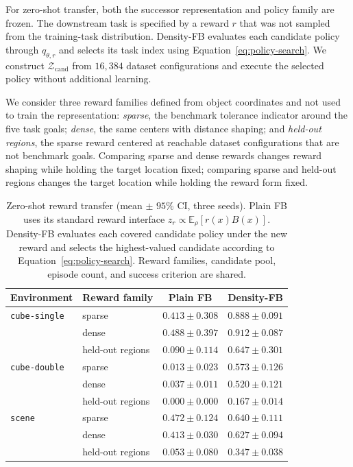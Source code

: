 \documentclass[11pt]{article}
\newcommand{\DensityFB}{Density-FB}
\begin{document}
For zero-shot transfer, both the successor representation and policy family are frozen. The downstream task is specified by a reward $r$ that was not sampled from the training-task distribution. Density-FB evaluates each candidate policy through $q_{\theta,r}$ and selects its task index using Equation~\eqref{eq:policy-search}. We construct $\mathcal Z_{\mathrm{cand}}$ from $16{,}384$ dataset configurations and execute the selected policy without additional learning.

We consider three reward families defined from object coordinates and not used to train the representation: \emph{sparse}, the benchmark tolerance indicator around the five task goals; \emph{dense}, the same centers with distance shaping; and \emph{held-out regions}, the sparse reward centered at reachable dataset configurations that are not benchmark goals. Comparing sparse and dense rewards changes reward shaping while holding the target location fixed; comparing sparse and held-out regions changes the target location while holding the reward form fixed.

\begin{table}[h]
\centering
\small
\setlength{\tabcolsep}{5pt}
\begin{tabular}{llcc}
\toprule
Environment & Reward family & Plain FB & \DensityFB{} \\
\midrule
\texttt{cube-single} & sparse & $0.413 \pm 0.308$ & $\mathbf{0.888 \pm 0.091}$ \\
& dense & $0.488 \pm 0.397$ & $\mathbf{0.912 \pm 0.087}$ \\
& held-out regions & $0.090 \pm 0.114$ & $\mathbf{0.647 \pm 0.301}$ \\
\midrule
\texttt{cube-double} & sparse & $0.013 \pm 0.023$ & $\mathbf{0.573 \pm 0.126}$ \\
& dense & $0.037 \pm 0.011$ & $\mathbf{0.520 \pm 0.121}$ \\
& held-out regions & $0.000 \pm 0.000$ & $\mathbf{0.167 \pm 0.014}$ \\
\midrule
\texttt{scene} & sparse & $0.472 \pm 0.124$ & $\mathbf{0.640 \pm 0.111}$ \\
& dense & $0.413 \pm 0.030$ & $\mathbf{0.627 \pm 0.094}$ \\
& held-out regions & $0.053 \pm 0.080$ & $\mathbf{0.347 \pm 0.038}$ \\
\bottomrule
\end{tabular}
\caption{Zero-shot reward transfer (mean $\pm$ $95\%$ CI, three seeds). Plain FB uses its standard reward interface $z_r\propto\mathbb E_\rho[r(x)B(x)]$. Density-FB evaluates each covered candidate policy under the new reward and selects the highest-valued candidate according to Equation~\eqref{eq:policy-search}. Reward families, candidate pool, episode count, and success criterion are shared.}
\label{tab:zeroshot}
\end{table}
\end{document}
